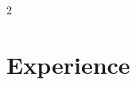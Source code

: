 \documentclass[]{vn-resume}
\begin{document}
\begin{paracol}{2}

\switchcolumn




    \section{Experience}


\end{paracol}
\end{document}
